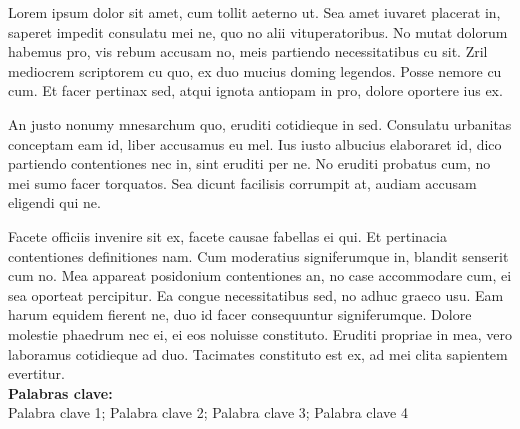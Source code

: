 
Lorem ipsum dolor sit amet, cum tollit aeterno ut. Sea amet iuvaret placerat in, saperet impedit consulatu mei ne, quo no alii vituperatoribus. No mutat dolorum habemus pro, vis rebum accusam no, meis partiendo necessitatibus cu sit. Zril mediocrem scriptorem cu quo, ex duo mucius doming legendos. Posse nemore cu cum. Et facer pertinax sed, atqui ignota antiopam in pro, dolore oportere ius ex.

An justo nonumy mnesarchum quo, eruditi cotidieque in sed. Consulatu urbanitas conceptam eam id, liber accusamus eu mel. Ius iusto albucius elaboraret id, dico partiendo contentiones nec in, sint eruditi per ne. No eruditi probatus cum, no mei sumo facer torquatos. Sea dicunt facilisis corrumpit at, audiam accusam eligendi qui ne.

Facete officiis invenire sit ex, facete causae fabellas ei qui. Et pertinacia contentiones definitiones nam. Cum moderatius signiferumque in, blandit senserit cum no. Mea appareat posidonium contentiones an, no case accommodare cum, ei sea oporteat percipitur. 
Ea congue necessitatibus sed, no adhuc graeco usu. Eam harum equidem fierent ne, duo id facer consequuntur signiferumque. 
Dolore molestie phaedrum nec ei, ei eos noluisse constituto. Eruditi propriae in mea, vero laboramus cotidieque ad duo. Tacimates constituto est ex, ad mei clita sapientem evertitur. \\


\noindent \textbf{Palabras clave:}\\
\noindent Palabra clave 1; Palabra clave 2; Palabra clave 3; Palabra clave 4